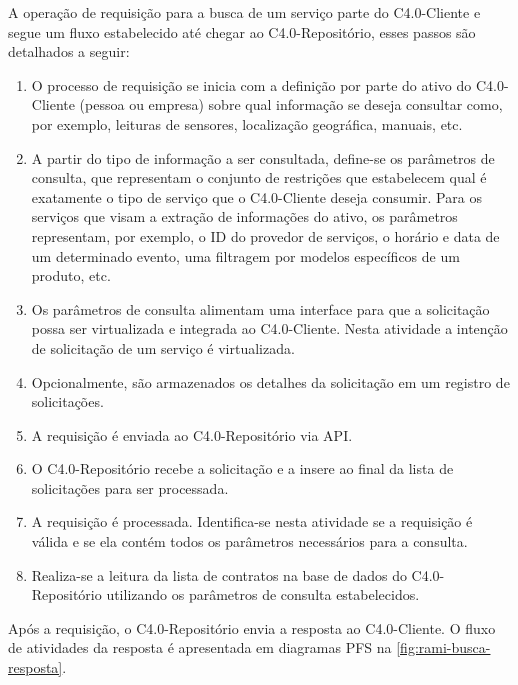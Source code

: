 A operação de requisição para a busca de um serviço parte do C4.0-Cliente e segue um fluxo estabelecido até chegar ao C4.0-Repositório, esses passos são detalhados a seguir:

\begin{enumerate}

	\item O processo de requisição se inicia com a definição por parte do ativo do C4.0-Cliente (pessoa ou empresa) sobre qual informação se deseja consultar como, por exemplo, leituras de sensores, localização geográfica, manuais, etc.

	\item A partir do tipo de informação a ser consultada, define-se os parâmetros de consulta, que representam o conjunto de restrições que estabelecem qual é exatamente o tipo de serviço que o C4.0-Cliente deseja consumir. Para os serviços que visam a extração de informações do ativo, os parâmetros representam, por exemplo, o ID do provedor de serviços, o horário e data de um determinado evento, uma filtragem por modelos específicos de um produto, etc.

	\item Os parâmetros de consulta alimentam uma interface para que a solicitação possa ser virtualizada e integrada ao C4.0-Cliente. Nesta atividade a intenção de solicitação de um serviço é virtualizada.

	\item Opcionalmente, são armazenados os detalhes da solicitação em um registro de solicitações.

	\item A requisição é enviada ao C4.0-Repositório via API.

	\item O C4.0-Repositório recebe a solicitação e a insere ao final da lista de solicitações para ser processada.

	\item A requisição é processada. Identifica-se nesta atividade se a requisição é válida e se ela contém todos os parâmetros necessários para a consulta.

	\item Realiza-se a leitura da lista de contratos na base de dados do C4.0-Repositório utilizando os parâmetros de consulta estabelecidos.

\end{enumerate}

Após a requisição, o C4.0-Repositório envia a resposta ao C4.0-Cliente. O fluxo de atividades da resposta é apresentada em diagramas PFS na \autoref{fig:rami-busca-resposta}.

